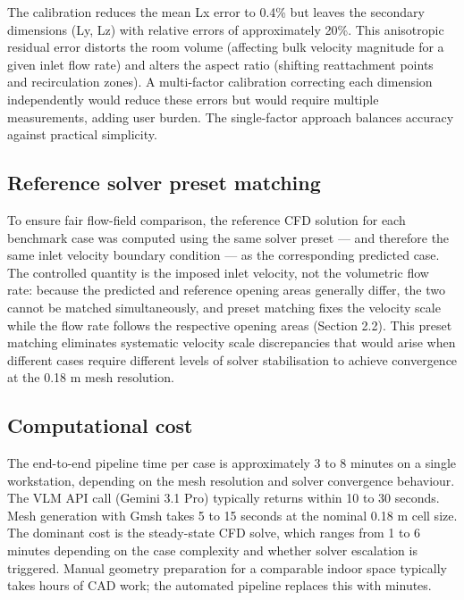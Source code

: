 \documentclass[preprint,12pt,number]{elsarticle}
\begin{document}
The calibration reduces the mean Lx error to 0.4\% but leaves the secondary dimensions (Ly, Lz) with relative errors of approximately 20\%. This anisotropic residual error distorts the room volume (affecting bulk velocity magnitude for a given inlet flow rate) and alters the aspect ratio (shifting reattachment points and recirculation zones). A multi-factor calibration correcting each dimension independently would reduce these errors but would require multiple measurements, adding user burden. The single-factor approach balances accuracy against practical simplicity.

\subsection{Reference solver preset matching}
\label{sec:reference-solver-preset-matching}


To ensure fair flow-field comparison, the reference CFD solution for each benchmark case was computed using the same solver preset --- and therefore the same inlet velocity boundary condition --- as the corresponding predicted case. The controlled quantity is the imposed inlet velocity, not the volumetric flow rate: because the predicted and reference opening areas generally differ, the two cannot be matched simultaneously, and preset matching fixes the velocity scale while the flow rate follows the respective opening areas (Section 2.2). This preset matching eliminates systematic velocity scale discrepancies that would arise when different cases require different levels of solver stabilisation to achieve convergence at the 0.18 m mesh resolution.

\subsection{Computational cost}
\label{sec:computational-cost}


The end-to-end pipeline time per case is approximately 3 to 8 minutes on a single workstation, depending on the mesh resolution and solver convergence behaviour. The VLM API call (Gemini 3.1 Pro) typically returns within 10 to 30 seconds. Mesh generation with Gmsh takes 5 to 15 seconds at the nominal 0.18 m cell size. The dominant cost is the steady-state CFD solve, which ranges from 1 to 6 minutes depending on the case complexity and whether solver escalation is triggered. Manual geometry preparation for a comparable indoor space typically takes hours of CAD work; the automated pipeline replaces this with minutes.
\end{document}
